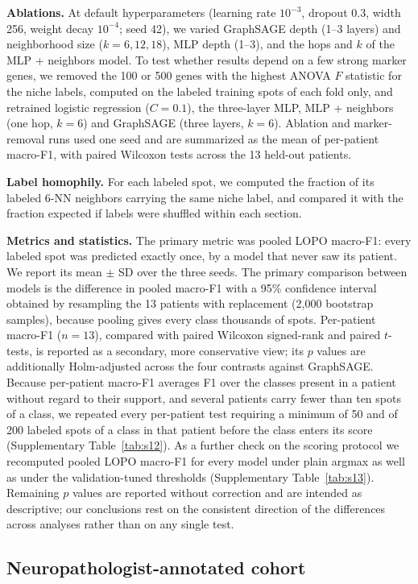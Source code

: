 \documentclass[11pt,letterpaper]{article}
\begin{document}
\textbf{Ablations.} At default hyperparameters (learning rate $10^{-3}$, dropout 0.3, width 256, weight decay $10^{-4}$; seed 42), we varied GraphSAGE depth (1--3 layers) and neighborhood size ($k = 6, 12, 18$), MLP depth (1--3), and the hops and $k$ of the MLP + neighbors model. To test whether results depend on a few strong marker genes, we removed the 100 or 500 genes with the highest ANOVA $F$ statistic for the niche labels, computed on the labeled training spots of each fold only, and retrained logistic regression ($C = 0.1$), the three-layer MLP, MLP + neighbors (one hop, $k = 6$) and GraphSAGE (three layers, $k = 6$). Ablation and marker-removal runs used one seed and are summarized as the mean of per-patient macro-F1, with paired Wilcoxon tests across the 13 held-out patients.

\textbf{Label homophily.} For each labeled spot, we computed the fraction of its labeled 6-NN neighbors carrying the same niche label, and compared it with the fraction expected if labels were shuffled within each section.

\textbf{Metrics and statistics.} The primary metric was pooled LOPO macro-F1: every labeled spot was predicted exactly once, by a model that never saw its patient. We report its mean $\pm$ SD over the three seeds. The primary comparison between models is the difference in pooled macro-F1 with a 95\% confidence interval obtained by resampling the 13 patients with replacement (2{,}000 bootstrap samples), because pooling gives every class thousands of spots. Per-patient macro-F1 ($n = 13$), compared with paired Wilcoxon signed-rank and paired $t$-tests, is reported as a secondary, more conservative view; its $p$ values are additionally Holm-adjusted across the four contrasts against GraphSAGE. Because per-patient macro-F1 averages F1 over the classes present in a patient without regard to their support, and several patients carry fewer than ten spots of a class, we repeated every per-patient test requiring a minimum of 50 and of 200 labeled spots of a class in that patient before the class enters its score (Supplementary Table~\ref{tab:s12}). As a further check on the scoring protocol we recomputed pooled LOPO macro-F1 for every model under plain argmax as well as under the validation-tuned thresholds (Supplementary Table~\ref{tab:s13}). Remaining $p$ values are reported without correction and are intended as descriptive; our conclusions rest on the consistent direction of the differences across analyses rather than on any single test.

\subsection{Neuropathologist-annotated cohort}
\end{document}
